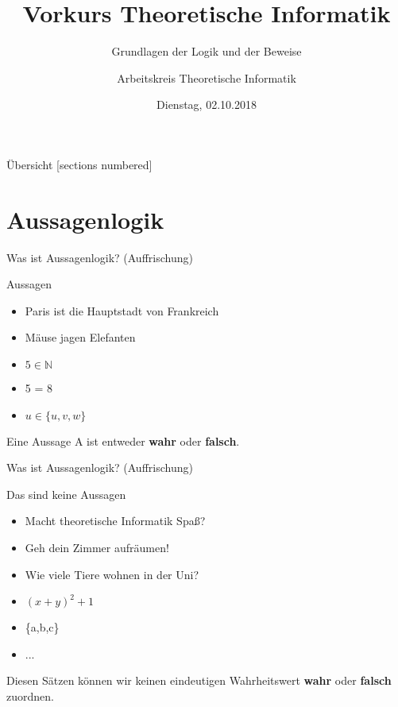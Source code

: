 

\title{Vorkurs Theoretische Informatik}
\subtitle{Grundlagen der Logik und der Beweise}
\date{Dienstag, 02.10.2018}
\author{Arbeitskreis Theoretische Informatik}



\maketitle

\begin{frame}[fragile]{Übersicht}
  [sections numbered]
  \tableofcontents
\end{frame}

\section{Aussagenlogik}

\begin{frame}[fragile]{Was ist Aussagenlogik? (Auffrischung)}
    \begin{alertblock}{Aussagen}
    \begin{itemize}
        \item Paris ist die Hauptstadt von Frankreich
        \item Mäuse jagen Elefanten
        \item $5 \in \mathbb{N}$
        \item 5 = 8
        \item $u \in \{u, v, w\}$
    \end{itemize}
    \end{alertblock}
    Eine Aussage A ist entweder \textbf{wahr} oder \textbf{falsch}.
\end{frame}

\begin{frame}[fragile]{Was ist Aussagenlogik? (Auffrischung)}
    \begin{alertblock}{Das sind keine Aussagen}
    \begin{itemize}
        \item Macht theoretische Informatik Spaß?
        \item Geh dein Zimmer aufräumen!
        \item Wie viele Tiere wohnen in der Uni?
        \item $(x+y)^2+1$
        \item \{a,b,c\}
        \item ...
    \end{itemize}
    \end{alertblock}
    Diesen Sätzen können wir keinen eindeutigen Wahrheitswert \textbf{wahr} oder \textbf{falsch} zuordnen.
\end{frame}


